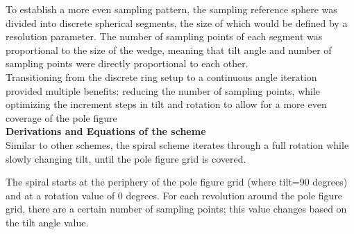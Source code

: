 \documentclass{article}
\begin{document}




To establish a more even sampling pattern, the sampling reference sphere was divided into discrete spherical segments, the size of which would be defined by a resolution parameter. The number of sampling points of each segment was proportional to the size of the wedge, meaning that tilt angle and number of sampling points were directly proportional to each other.\\

Transitioning from the discrete ring setup to a continuous angle iteration provided multiple benefits: reducing the number of sampling points, while optimizing the increment steps in tilt and rotation to allow for a more even coverage of the pole figure\\

\textbf{Derivations and Equations of the scheme}\\

Similar to other schemes, the spiral scheme iterates through a full rotation while slowly changing tilt, until the pole figure grid is covered. 

The spiral starts at the periphery of the pole figure grid (where tilt=90 degrees) and at a rotation value of 0 degrees. For each revolution around the pole figure grid, there are a certain number of sampling points; this value changes based on the tilt angle value. 
\end{document}
